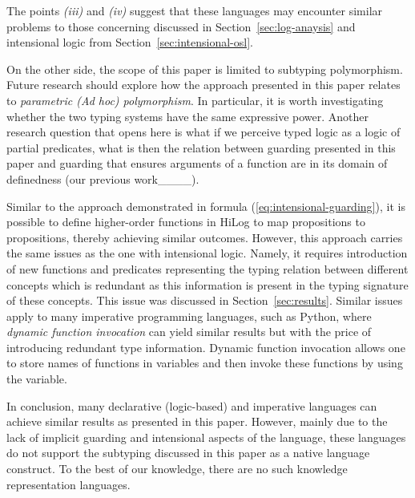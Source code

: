 The points \textit{(iii)} and \textit{(iv)} suggest that these languages may encounter similar problems to those concerning \OSL discussed in Section~\ref{sec:log-anaysis} and intensional logic from Section~\ref{sec:intensional-osl}.

On the other side, the scope of this paper is limited to subtyping polymorphism. 
Future research should explore how the approach presented in this paper relates to \emph{parametric (Ad hoc) polymorphism}.
In particular, it is worth investigating whether the two typing systems have the same expressive power.
Another research question that opens here is what if we perceive typed logic as a logic of partial predicates, what is then the relation between guarding presented in this paper and guarding that ensures arguments of a function are in its domain of definedness (our previous work____).

Similar to the approach demonstrated in formula (\ref{eq:intensional-guarding}), it is possible to define higher-order functions in HiLog to map propositions to propositions, thereby achieving similar outcomes. 
However, this approach carries the same issues as the one with intensional logic.
Namely, it requires introduction of new functions and predicates representing the typing relation between different concepts which is redundant as this information is present in the typing signature of these concepts. 
This issue was discussed in Section~\ref{sec:results}.  
Similar issues apply to many imperative programming languages, such as Python, where \emph{dynamic function invocation} can yield similar results but with the price of introducing redundant type information. 
Dynamic function invocation allows one to store names of functions in variables and then invoke these functions by using the variable.

In conclusion, many declarative (logic-based) and imperative languages can achieve similar results as presented in this paper. However, mainly due to the lack of implicit guarding and intensional aspects of the language, these languages do not support the subtyping discussed in this paper as a native language construct. To the best of our knowledge, there are no such knowledge representation languages.